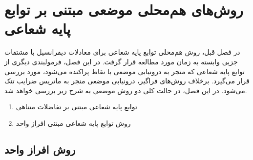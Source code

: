 
\chapter{روش‌های هم‌محلی موضعی مبتنی بر توابع پایه شعاعی  }\label{se:rbfloc}
%
در فصل قبل، روش هم‌محلی توابع پایه شعاعی برای معادلات دیفرانسیل با مشتقات جزیی وابسته به زمان مورد مطالعه قرار گرفت. در این فصل، فرمولبندی دیگری از توابع پایه شعاعی که منجر به درونیابی موضعی با نقاط پراکنده  می‌شود، مورد بررسی قرار می‌گیرد. برخلاف روش‌های فراگیر، درونیابی موضعی منجر به ماتریس ضرایب تنک می‌شود. در این فصل، در حالت کلی دو روش موضعی به شرح زیر بررسی خواهد شد.

\begin{enumerate}
	\item توابع پایه شعاعی مبتنی بر تفاضلات متناهی
	\item روش توابع پایه شعاعی مبتنی افراز واحد
\end{enumerate}

\section{روش افراز واحد}